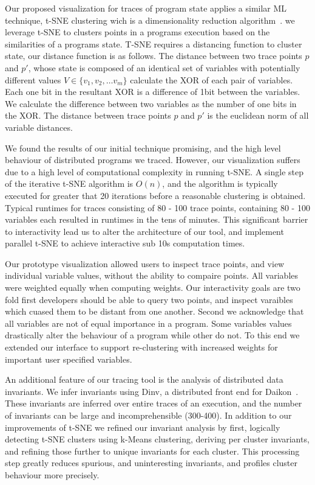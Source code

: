 Our proposed visualization for traces of program state applies a similar ML
technique, t-SNE clustering wich is a dimensionality reduction
algorithm~\cite{Hinton_visualizingdata}. we leverage t-SNE to clusters points in a programs
execution based on the similarities of a programs state.  T-SNE requires a
distancing function to cluster state, our distance function is as follows. The
distance between two trace points $p$ and $p'$, whose state is composed of an
identical set of variables with potentially different values $V \in \{v_1, v_2,
\dots v_m\}$ calculate the XOR of each pair of variables. Each one bit in the
resultant XOR is a difference of 1bit between the variables. We calculate the
difference between two variables as the number of one bits in the XOR. The
distance between trace points $p$ and $p'$ is the euclidean norm of all
variable distances.

We found the results of our initial technique promising, and the high level
behaviour of distributed programs we traced. However, our visualization suffers
due to a high level of computational complexity in running t-SNE. A single step
of the iterative t-SNE algorithm is $O(n)$, and the algorithm is typically
executed for greater that 20 iterations before a reasonable clustering is
obtained. Typical runtimes for traces consisting of 80 - 100 trace points,
containing 80 - 100 variables each resulted in runtimes in the tens of minutes.
This significant barrier to interactivity lead us to alter the architecture of
our tool, and implement parallel t-SNE to achieve interactive sub 10s
computation times. 

Our prototype visualization allowed users to inspect trace points, and
view individual variable values, without the ability to compaire
points. All variables were weighted equally when computing weights.
Our interactivity goals are two fold first developers should be able
to query two points, and inspect varaibles which cuased them to be
distant from one another. Second we acknowledge that all variables are
not of equal importance in a program. Some variables values
drastically alter the behaviour of a program while other do not. To
this end we extended our interface to support re-clustering with
increased weights for important user specified variables.

An additional feature of our tracing tool is the analysis of
distributed data invariants. We infer invariants using Dinv, a
distributed front end for Daikon~\cite{Ernst99dynamicallydiscovering}.
These invariants are inferred over entire traces of an execution, and
the number of invariants can be large and incomprehensible (300-400).
In addition to our improvements of t-SNE we refined our invariant
analysis by first, logically detecting t-SNE clusters using k-Means
clustering, deriving per cluster invariants, and refining those
further to unique invariants for each cluster. This processing step
greatly reduces spurious, and uninteresting invariants, and profiles
cluster behaviour more precisely.

